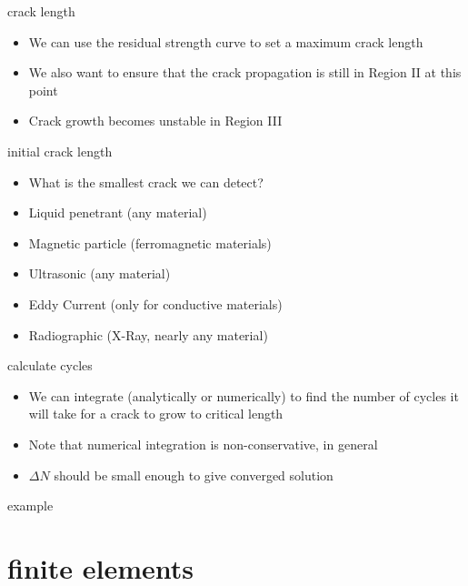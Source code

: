 \documentclass[10pt]{beamer}
\begin{document}
	\begin{frame}{crack length}
		\begin{itemize}[<+->]
			\item We can use the residual strength curve to set a maximum crack length
			\item We also want to ensure that the crack propagation is still in Region II at this point
			\item Crack growth becomes unstable in Region III
		\end{itemize}
	\end{frame}
	
	\begin{frame}{initial crack length}
		\begin{itemize}[<+->]
			\item What is the smallest crack we can detect?
			\item Liquid penetrant (any material)
			\item Magnetic particle (ferromagnetic materials)
			\item Ultrasonic (any material)
			\item Eddy Current (only for conductive materials)
			\item Radiographic (X-Ray, nearly any material)
		\end{itemize}
	\end{frame}
	
	\begin{frame}{calculate cycles}
		\begin{itemize}[<+->]
			\item We can integrate (analytically or numerically) to find the number of cycles it will take for a crack to grow to critical length
			\item Note that numerical integration is non-conservative, in general
			\item $\Delta N$ should be small enough to give converged solution
		\end{itemize}
	\end{frame}
	
	\begin{frame}{example}
		
	\end{frame}
	
	\section{finite elements}
	
\end{document}
